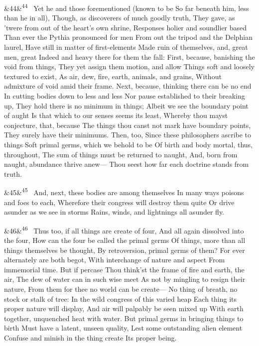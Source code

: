 \documentclass[12pt]{article}
\newcommand{\para}[1][]{\par\noindent\ifx&#1&\else\textsuperscript{\footnotesize #1}~\fi}
\begin{document}
\para[44] Yet he and those forementioned (known to be So far beneath him, less than he in all), Though, as discoverers of much goodly truth, They gave, as 'twere from out of the heart's own shrine, Responses holier and soundlier based Than ever the Pythia pronounced for men From out the tripod and the Delphian laurel, Have still in matter of first-elements Made ruin of themselves, and, great men, great Indeed and heavy there for them the fall: First, because, banishing the void from things, They yet assign them motion, and allow Things soft and loosely textured to exist, As air, dew, fire, earth, animals, and grains, Without admixture of void amid their frame. Next, because, thinking there can be no end In cutting bodies down to less and less Nor pause established to their breaking up, They hold there is no minimum in things; Albeit we see the boundary point of aught Is that which to our senses seems its least, Whereby thou mayst conjecture, that, because The things thou canst not mark have boundary points, They surely have their minimums. Then, too, Since these philosophers ascribe to things Soft primal germs, which we behold to be Of birth and body mortal, thus, throughout, The sum of things must be returned to naught, And, born from naught, abundance thrive anew--- Thou seest how far each doctrine stands from truth.

\para[45] And, next, these bodies are among themselves In many ways poisons and foes to each, Wherefore their congress will destroy them quite Or drive asunder as we see in storms Rains, winds, and lightnings all asunder fly.

\para[46] Thus too, if all things are create of four, And all again dissolved into the four, How can the four be called the primal germs Of things, more than all things themselves be thought, By retroversion, primal germs of them? For ever alternately are both begot, With interchange of nature and aspect From immemorial time. But if percase Thou think'st the frame of fire and earth, the air, The dew of water can in such wise meet As not by mingling to resign their nature, From them for thee no world can be create--- No thing of breath, no stock or stalk of tree: In the wild congress of this varied heap Each thing its proper nature will display, And air will palpably be seen mixed up With earth together, unquenched heat with water. But primal germs in bringing things to birth Must have a latent, unseen quality, Lest some outstanding alien element Confuse and minish in the thing create Its proper being.
\end{document}
